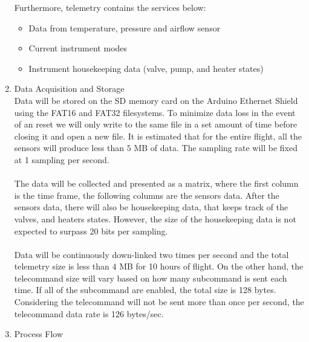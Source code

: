 \documentclass[a4paper,12pt,twoside]{article}
\begin{document}
\begin{enumerate}[label=(\alph*)]
Furthermore, telemetry contains the services below:
\begin{itemize}
    \item Data from temperature, pressure and airflow sensor
    \item Current instrument modes
    \item Instrument housekeeping data (valve, pump, and heater states)
\end{itemize}
\item{Data Acquisition and Storage}\\
Data will be stored on the SD memory card on the Arduino Ethernet Shield using the FAT16 and FAT32 filesystems. To minimize data loss in the event of an reset we will only write to the same file in a set amount of time before closing it and open a new file. It is estimated that for the entire flight, all the sensors will produce less than $5$ MB of data. The sampling rate will be fixed at 1 sampling per second.\\
\\
The data will be collected and presented as a matrix, where the first column is the time frame, the following columns are the sensors data. After the sensors data, there will also be housekeeping data, that keeps track of the valves, and heaters states. However, the size of the housekeeping data is not expected to surpass 20 bits per sampling.\\
\\
Data will be continuously down-linked two times per second and the total telemetry size is less than $4$ MB for 10 hours of flight. On the other hand, the telecommand size will vary based on how many subcommand is sent each time. If all of the subcommand are enabled, the total size is 128 bytes. Considering the telecommand will not be sent more than once per second, the telecommand data rate is 126 bytes/sec.
\item{Process Flow}\\

\end{enumerate}
\end{document}
